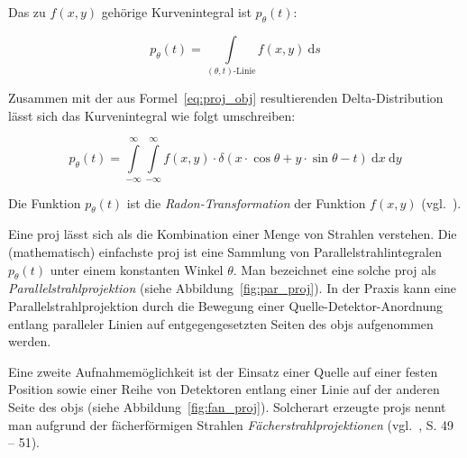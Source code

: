 Das zu $f(x, y)$ gehörige Kurvenintegral ist $p_{\theta}(t)$:

\begin{equation}\label{eq:proj_int}
    p_{\theta}(t) = \int\limits_{(\theta, t)\text{-Linie}} f(x, y)\ \mathrm{d}s
\end{equation}

Zusammen mit der aus Formel~\ref{eq:proj_obj} resultierenden Delta-Distribution lässt sich das Kurvenintegral wie folgt
umschreiben:

\begin{equation}\label{eq:proj_radon}
    p_{\theta}(t) = \int\limits_{-\infty}^{\infty}\int\limits_{-\infty}^{\infty}f(x, y) \cdot \delta(x \cdot
                    \cos \theta + y \cdot \sin \theta - t)\ \mathrm{d} x\ \mathrm{d} y
\end{equation}

Die Funktion $p_{\theta}(t)$ ist die \textit{Radon-Transformation} der Funktion $f(x, y)$ (vgl.~\cite{radon}).

Eine \gls{proj} lässt sich als die Kombination einer Menge von Strahlen verstehen. Die (mathematisch) einfachste
\gls{proj} ist eine Sammlung von Parallelstrahlintegralen $p_{\theta}(t)$ unter einem konstanten Winkel $\theta$. Man
bezeichnet eine solche \gls{proj} als \textit{Parallelstrahlprojektion} (siehe Abbildung~\ref{fig:par_proj}). In der
Praxis kann eine Parallelstrahlprojektion durch die Bewegung einer Quelle-Detektor-Anordnung entlang paralleler Linien
auf entgegengesetzten Seiten des \gls{obj}s aufgenommen werden.

Eine zweite Aufnahmemöglichkeit ist der Einsatz einer Quelle auf einer festen Position sowie einer Reihe von Detektoren
entlang einer Linie auf der anderen Seite des \gls{obj}s (siehe Abbildung~\ref{fig:fan_proj}). Solcherart erzeugte
\glspl{proj} nennt man aufgrund der fächerförmigen Strahlen \textit{Fächerstrahlprojektionen} (vgl.~\cite{kakslan},
S. 49 -- 51).

